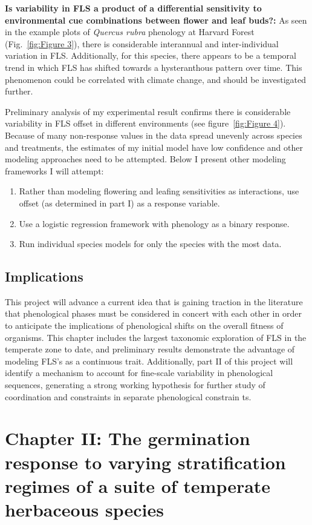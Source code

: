 \documentclass[12pt]{article}\usepackage[]{graphicx}\usepackage[]{color}
\begin{document}
\par\textbf{Is variability in FLS a product of a differential sensitivity to environmental cue combinations between flower and leaf buds?:} As seen in the  example plots of \textit{Quercus rubra} phenology at Harvard Forest (Fig.~\ref{fig:Figure 3}), there is considerable interannual and inter-individual variation in FLS. Additionally, for this species, there appears to be a temporal trend in which FLS has shifted towards a hysteranthous pattern over time. This phenomenon could be correlated with climate change, and should be investigated further.
\par Preliminary analysis of my experimental result confirms there is considerable variability in FLS offset in different environments (see figure~\ref{fig:Figure 4}). Because of many non-response values in the data spread unevenly across species and treatments, the estimates of my initial model have low confidence and other modeling approaches need to be attempted. Below I present other modeling frameworks I will attempt:
\begin{enumerate}
\item Rather than modeling flowering and leafing sensitivities as interactions, use offset (as determined in part I) as a response variable.
\item Use a logistic regression framework with phenology as a binary response.
\item Run individual species models for only the species with the most data.
\end{enumerate}
\subsection*{Implications}
\indent\indent This project will advance a current idea that is gaining traction in the literature that phenological phases must be considered in concert with each other in order to anticipate the implications of phenological shifts on the overall fitness of organisms. This chapter includes the largest taxonomic exploration of FLS in the temperate zone to date, and preliminary results demonstrate the advantage of modeling FLS's as a continuous trait. Additionally, part II of this project will identify a mechanism to account for fine-scale variability in phenological sequences, generating a strong working hypothesis for further study of coordination and constraints in separate phenological constrain
ts.
\section*{Chapter II: The germination response to varying stratification regimes of a suite of temperate herbaceous species}
\end{document}

